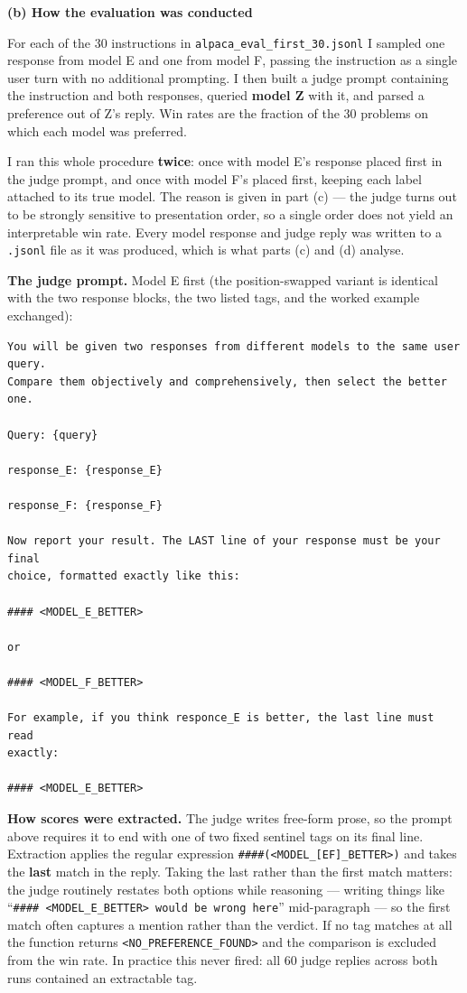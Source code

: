 \begin{answer}

\textbf{(b) How the evaluation was conducted}

For each of the 30 instructions in \texttt{alpaca\_eval\_first\_30.jsonl} I
sampled one response from model E and one from model F, passing the instruction
as a single user turn with no additional prompting. I then built a judge prompt
containing the instruction and both responses, queried \textbf{model Z} with it,
and parsed a preference out of Z's reply. Win rates are the fraction of the 30
problems on which each model was preferred.

I ran this whole procedure \textbf{twice}: once with model E's response placed
first in the judge prompt, and once with model F's placed first, keeping each
label attached to its true model. The reason is given in part (c) --- the judge
turns out to be strongly sensitive to presentation order, so a single order
does not yield an interpretable win rate. Every model response and judge reply
was written to a \texttt{.jsonl} file as it was produced, which is what parts (c)
and (d) analyse.

\textbf{The judge prompt.} Model E first (the position-swapped variant is
identical with the two response blocks, the two listed tags, and the worked
example exchanged):

\begin{lstlisting}[language={},numbers=none,basicstyle=\footnotesize\ttfamily,frame=single]
You will be given two responses from different models to the same user query.
Compare them objectively and comprehensively, then select the better one.

Query: {query}

response_E: {response_E}

response_F: {response_F}

Now report your result. The LAST line of your response must be your final
choice, formatted exactly like this:

#### <MODEL_E_BETTER>

or

#### <MODEL_F_BETTER>

For example, if you think responce_E is better, the last line must read
exactly:

#### <MODEL_E_BETTER>
\end{lstlisting}

\textbf{How scores were extracted.} The judge writes free-form prose, so the
prompt above requires it to end with one of two fixed sentinel tags on its final
line. Extraction applies the regular expression
\texttt{\#\#\#\#\textvisiblespace(<MODEL\_[EF]\_BETTER>)} and takes the
\textbf{last} match in the reply. Taking the last rather than the first match
matters: the judge routinely restates both options while reasoning --- writing
things like ``\texttt{\#\#\#\# <MODEL\_E\_BETTER> would be wrong here}''
mid-paragraph --- so the first match often captures a mention rather than the
verdict. If no tag matches at all the function returns
\texttt{<NO\_PREFERENCE\_FOUND>} and the comparison is excluded from the win
rate. In practice this never fired: all 60 judge replies across both runs
contained an extractable tag.


\end{answer}
